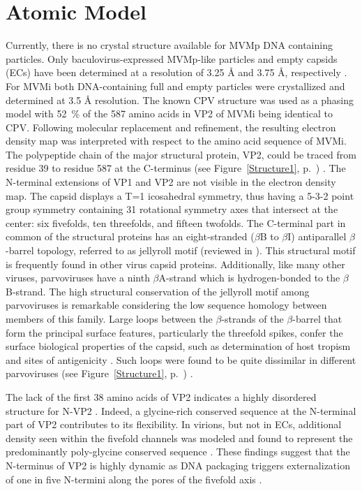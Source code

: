 \section{Atomic Model}
\label{Structure}
Currently, there is no crystal structure available for MVMp DNA containing particles. Only baculovirus-expressed MVMp-like particles and empty capsids (ECs) have been determined at a resolution of 3.25 \r{A} and 3.75 \r{A}, respectively \cite{pmid16103145}. For MVMi both DNA-containing full and empty particles were crystallized and determined at 3.5 \r{A} resolution. The known CPV structure \cite{pmid3379641} was used as a phasing model with 52~\% of the 587 amino acids in VP2 of MVMi being identical to CPV. Following molecular replacement and refinement, the resulting electron density map was interpreted with respect to the amino acid sequence of MVMi. The polypeptide chain of the major structural protein, VP2, could be traced from residue 39 to residue 587 at the C-terminus (see Figure~\ref{Structure1}, p.~\pageref{Structure1}) \cite{pmid15299974}. The N-terminal extensions of VP1 and VP2 are not visible in the electron density map. The capsid displays a T=1 icosahedral symmetry, thus having a 5-3-2 point group symmetry containing 31 rotational symmetry axes that intersect at the center: six fivefolds, ten threefolds, and fifteen twofolds. The C-terminal part in common of the structural proteins has an eight-stranded ($\beta$B to $\beta$I) antiparallel $\beta$-barrel topology, referred to as jellyroll motif (reviewed in \cite{pmid2673017, Fundamental_Virology}). This structural motif is frequently found in other virus capsid proteins. Additionally, like many other viruses, parvoviruses have a ninth $\beta$A-strand which is hydrogen-bonded to the $\beta$B-strand. The high structural conservation of the jellyroll motif among parvoviruses is remarkable considering the low sequence homology between members of this family. Large loops between the $\beta$-strands of the $\beta$-barrel that form the principal surface features, particularly the threefold spikes, confer the surface biological properties of the capsid, such as determination of host tropism \cite{pmid1316457, pmid3942033} and sites of antigenicity \cite{pmid8985402, pmid1942246}. Such loops were found to be quite dissimilar in different parvoviruses (see Figure~\ref{Structure1}, p.~\pageref{Structure1}) \cite{pmid8503170}. 

The lack of the first 38 amino acids of VP2 indicates a highly disordered structure for N-VP2 \cite{pmid15299974}. Indeed, a glycine-rich conserved sequence at the N-terminal part of VP2 contributes to its flexibility. In virions, but not in ECs, additional density seen within the fivefold channels was modeled and found to represent the predominantly poly-glycine conserved sequence \cite{pmid15299494, pmid8969301}. These findings suggest that the N-terminus of VP2 is highly dynamic as DNA packaging triggers externalization of one in five N-termini along the pores of the fivefold axis \cite{pmid9817841}.
 
